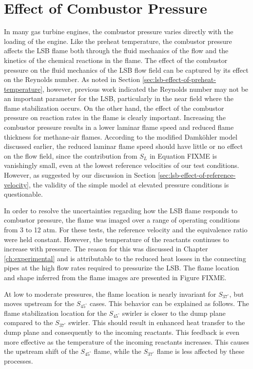 \section{Effect of Combustor Pressure}
\label{sec:lsb-effect-of-combustor-pressure}

In many gas turbine engines, the combustor pressure varies directly with the loading of the engine.
Like the preheat temperature, the combustor pressure affects the LSB flame both through the fluid mechanics of the flow and the kinetics of the chemical reactions in the flame.
The effect of the combustor pressure on the fluid mechanics of the LSB flow field can be captured by its effect on the Reynolds number.
As noted in Section \ref{sec:lsb-effect-of-preheat-temperature}, however, previous work indicated the Reynolds number may not be an important parameter for the LSB, particularly in the near field where the flame stabilization occurs. 
On the other hand, the effect of the combustor pressure on reaction rates in the flame is clearly important.
Increasing the combustor pressure results in a lower laminar flame speed and reduced flame thickness for methane-air flames.
According to the modified Damk\"ohler model discussed earlier, the reduced laminar flame speed should have little or no effect on the flow field, since the contribution from \(S_L\) in Equation FIXME is vanishingly small, even at the lowest reference velocities of our test conditions.
However, as suggested by our discussion in Section \ref{sec:lsb-effect-of-reference-velocity}, the validity of the simple model at elevated pressure conditions is questionable.

In order to resolve the uncertainties regarding how the LSB flame responds to combustor pressure, the flame was imaged over a range of operating conditions from 3 to 12 atm.
For these tests, the reference velocity and the equivalence ratio were held constant.
However, the temperature of the reactants continues to increase with pressure.
The reason for this was discussed in Chapter \ref{ch:experimental} and is attributable to the reduced heat losses in the connecting pipes at the high flow rates required to pressurize the LSB.
The flame location and shape inferred from the flame images are presented in Figure FIXME.

At low to moderate pressures, the flame location is nearly invariant for \(S_{37^\circ}\), but moves upstream for the \(S_{45^\circ}\) cases.
This behavior can be explained as follows.
The flame stabilization location for the \(S_{45^\circ}\) swirler is closer to the dump plane compared to the \(S_{37^\circ}\) swirler.
This should result in enhanced heat transfer to the dump plane and consequently to the incoming reactants.
This feedback is even more effective as the temperature of the incoming reactants increases.
This causes the upstream shift of the \(S_{45^\circ}\) flame, while the \(S_{37^\circ}\) flame is less affected by these processes.

